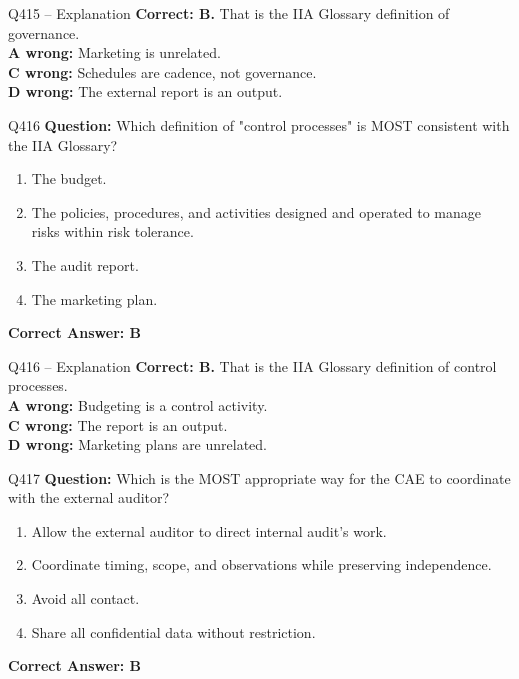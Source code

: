\documentclass[aspectratio=169,10pt]{beamer}
\begin{document}
	\begin{frame}[t]{Q415 -- Explanation}
		\small
		\textbf{Correct: B.} That is the IIA Glossary definition of governance. \\[4pt]
		\textbf{A wrong:} Marketing is unrelated. \\[2pt]
		\textbf{C wrong:} Schedules are cadence, not governance. \\[2pt]
		\textbf{D wrong:} The external report is an output.
	\end{frame}
	
	\begin{frame}[t]{Q416}
		\small
		\textbf{Question:} Which definition of "control processes" is MOST consistent with the IIA Glossary?
		\begin{enumerate}[label=\Alph*.,itemsep=1pt,topsep=2pt]
			\item The budget.
			\item The policies, procedures, and activities designed and operated to manage risks within risk tolerance.
			\item The audit report.
			\item The marketing plan.
		\end{enumerate}
		\vspace{4pt}
		\textbf{Correct Answer: B}
	\end{frame}
	
	\begin{frame}[t]{Q416 -- Explanation}
		\small
		\textbf{Correct: B.} That is the IIA Glossary definition of control processes. \\[4pt]
		\textbf{A wrong:} Budgeting is a control activity. \\[2pt]
		\textbf{C wrong:} The report is an output. \\[2pt]
		\textbf{D wrong:} Marketing plans are unrelated.
	\end{frame}
	
	\begin{frame}[t]{Q417}
		\small
		\textbf{Question:} Which is the MOST appropriate way for the CAE to coordinate with the external auditor?
		\begin{enumerate}[label=\Alph*.,itemsep=1pt,topsep=2pt]
			\item Allow the external auditor to direct internal audit's work.
			\item Coordinate timing, scope, and observations while preserving independence.
			\item Avoid all contact.
			\item Share all confidential data without restriction.
		\end{enumerate}
		\vspace{4pt}
		\textbf{Correct Answer: B}
	\end{frame}
	
\end{document}
